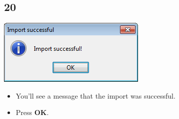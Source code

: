 \documentclass{beamer}
\begin{document}
\subsection{20}
\begin{frame}
	\begin{center}
  		\includegraphics[height=0.2\textheight]{20.png}
	\end{center}
	\begin{itemize}
		\item You'll see a message that the import was successful.
		\item Press \textbf{OK}.
	\end{itemize}
\end{frame}
\end{document}
